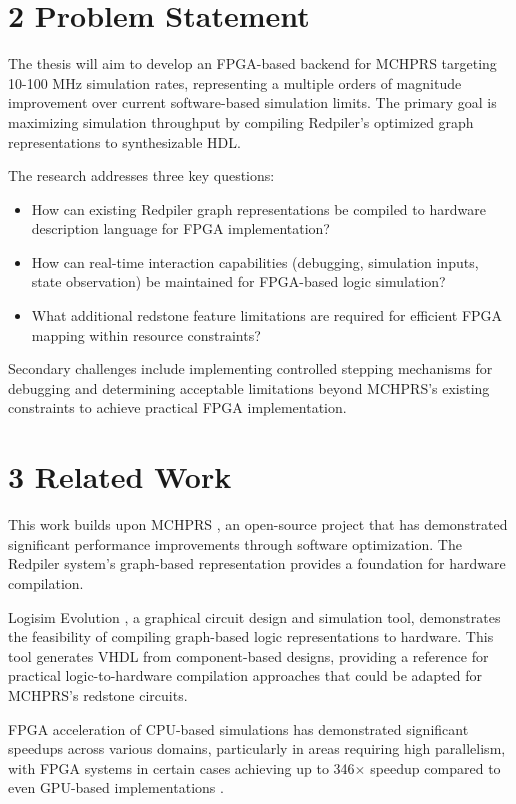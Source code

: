 \documentclass[a4paper,11pt]{article}
\begin{document}
\section*{2 Problem Statement}

The thesis will aim to develop an FPGA-based backend for MCHPRS targeting 10-100 MHz simulation rates, representing a multiple orders of magnitude improvement over current software-based simulation limits.
The primary goal is maximizing simulation throughput by compiling Redpiler's optimized graph representations to synthesizable HDL.

The research addresses three key questions:
\begin{itemize}[parsep=0.5em]
    \item How can existing Redpiler graph representations be compiled to hardware description language for FPGA implementation?
    \item How can real-time interaction capabilities (debugging, simulation inputs, state observation) be maintained for FPGA-based logic simulation?
    \item What additional redstone feature limitations are required for efficient FPGA mapping within resource constraints?
\end{itemize}

Secondary challenges include implementing controlled stepping mechanisms for debugging and determining acceptable limitations beyond MCHPRS's existing constraints to achieve practical FPGA implementation.

\section*{3 Related Work}

This work builds upon MCHPRS \cite{mchprs}, an open-source project that has demonstrated significant performance improvements through software optimization.
The Redpiler system's graph-based representation provides a foundation for hardware compilation.

Logisim Evolution \cite{logisimevolution}, a graphical circuit design and simulation tool, demonstrates the feasibility of compiling graph-based logic representations to hardware.
This tool generates VHDL from component-based designs, providing a reference for practical logic-to-hardware compilation approaches that could be adapted for MCHPRS's redstone circuits.

FPGA acceleration of CPU-based simulations has demonstrated significant speedups across various domains, particularly in areas requiring high parallelism, with FPGA systems in certain cases achieving up to 346$\times$ speedup compared to even GPU-based implementations \cite[p. 14, Table 1]{fpgaaccelsurvey}.
\end{document}
